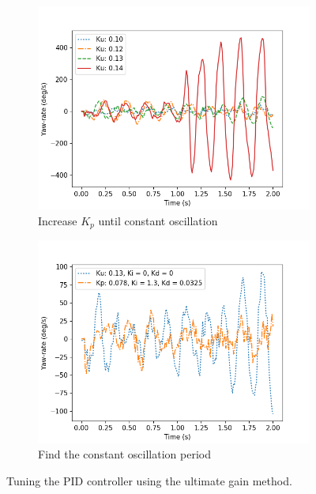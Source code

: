 \begin{figure}
	\begin{subfigure}[b]{0.49\textwidth}
		\includegraphics[width=\textwidth]{pics/straight_ku.png}
		\caption{Increase $K_p$ until constant oscillation}
		\label{fig:ultimate_gain}
	\end{subfigure}
	\begin{subfigure}[b]{0.49\textwidth}
		\includegraphics[width=\textwidth]{pics/straight_ku_with_tu.png}
		\caption{Find the constant oscillation period}
		\label{fig:gain_tuning}
	\end{subfigure}
	\caption{Tuning the PID controller using the ultimate gain method.}
\end{figure}

